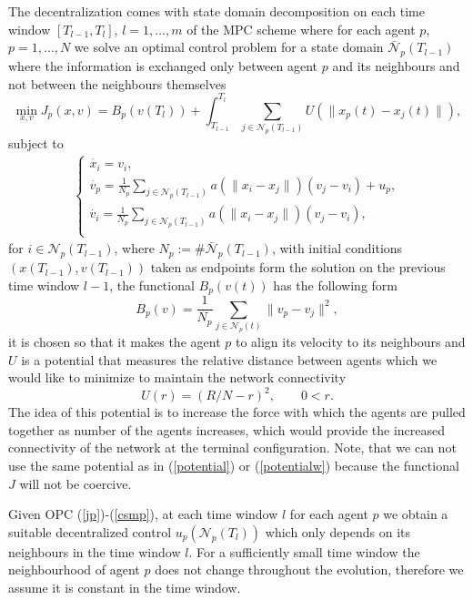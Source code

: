 \documentclass[a4paper,10pt, english]{article}
\newcommand{\D}{\displaystyle}
\begin{document}
 
   The decentralization comes with state domain decomposition on each time window $[T_{l-1}, T_{l}]$, $l = 1, \dots, m$  of the MPC scheme where for each agent $p$, $p = 1, \dots, N$ we solve an optimal control problem for a state domain $\bar{\mathcal{N}}_p(T_{l-1})$ where the information is exchanged only between agent $p$ and its neighbours and not between the neighbours themselves
   \begin{equation}
    \min_{x, v} J_p(x, v) = B_p(v(T_l)) + \int_{T_{l-1}}^{T_l}\sum_{j\in \mathcal{N}_p(T_{l-1})} U(\|x_p(t) - x_j(t)\|),
   \label{jp}
   \end{equation}
   subject to 
   \begin{align}
   \begin{cases}
   \D
   \dot{x_i} = v_i,\\
   \dot{v_p} = \frac{1}{N_p}\sum_{j\in \mathcal{N}_p(T_{l-1})}a(\|x_i - x_j\|)(v_j - v_i) + u_p, \\
   \dot{v_i} = \frac{1}{N_p}\sum_{j\in \mathcal{N}_p(T_{l-1})}a(\|x_i - x_j\|)(v_j - v_i),\\
   \end{cases}
   \label{csmp}
   \end{align}
  for $i\in\mathcal{N}_p(T_{l-1})$, where $N_p:= \# \bar{\mathcal{N}}_p(T_{l-1})$, with initial conditions $(x(T_{l-1}), v(T_{l-1}))$ taken as endpoints form the solution on the previous time window $l-1$,
  the functional $B_p(v(t))$ has the following form 
  \begin{equation}
  B_p(v) = \frac{1}{N_p}\sum_{j \in \mathcal{N}_p(t)} \| v_p - v_j \|^2,
  \label{bp}
  \end{equation}
  it is chosen so that it makes the agent  $p$ to align its velocity to its neighbours and 
  $U$ is a potential that measures the relative distance between agents which we would like to minimize to maintain the network connectivity
    \begin{equation}
    U(r) = (R/N- r)^2, \qquad 0 < r.
    \label{potentialbar}
    \end{equation}
    The idea of this potential is to increase the force with which the agents are pulled together as number of the agents increases, which would provide the increased connectivity of the network at the terminal configuration. Note, that we can not use the same potential as in (\ref{potential}) or (\ref{potentialw}) because the functional $J$ will not be coercive.
  
 Given OPC (\ref{jp})-(\ref{csmp}), at each time window $l$ for each agent $p$ we obtain a suitable decentralized control $u_p(\mathcal{N}_p(T_l))$ which only depends on its neighbours in the time window $l$.
 For a sufficiently small time window the  neighbourhood of agent $p$ does not change throughout the evolution, therefore we assume it is constant in the time window. 
\end{document}
